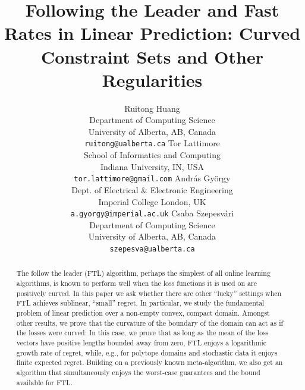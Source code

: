 \documentclass[english]{article}
\title{
Following the Leader and
Fast Rates in Linear Prediction:
Curved Constraint Sets and Other Regularities
}
\author{
 Ruitong Huang \\
 Department of Computing Science\\
 University of Alberta, AB, Canada \\
 \texttt{ruitong@ualberta.ca}  \vspace{-0.04cm}
 \And 
 Tor Lattimore \\
 School of Informatics and Computing \\
 Indiana University, IN, USA \\
 \texttt{tor.lattimore@gmail.com} \vspace{-0.04cm}
 \And
 Andr\'as Gy\"orgy \\
 Dept. of Electrical \& Electronic Engineering\\ 
 Imperial College London, UK\\ 
 \texttt{a.gyorgy@imperial.ac.uk} 
 \And 
 Csaba Szepesv\'ari\\
 Department of Computing Science\\
 University of Alberta, AB, Canada \\
 \texttt{szepesva@ualberta.ca}
}
\begin{document}

\maketitle

\begin{abstract}
The follow the leader (FTL) algorithm, perhaps the simplest of all online learning algorithms,
is known to perform well when the loss functions it is used on are positively curved.
In this paper we ask whether there are other ``lucky'' settings when FTL achieves sublinear, ``small'' regret.
In particular, we study the fundamental problem of linear prediction over a non-empty convex, compact domain.
Amongst other results, we prove that the curvature of  the boundary of the domain can act as if the losses
were curved: In this case, we prove that as long as 
the mean of the loss vectors have positive lengths bounded away from zero, 
FTL enjoys a logarithmic growth rate of regret, while, e.g., for polytope domains and stochastic data it enjoys
finite expected regret. 
Building on a previously known meta-algorithm, we also get
 an algorithm that simultaneously enjoys the worst-case guarantees and the bound available for FTL.
\end{abstract}
\end{document}
